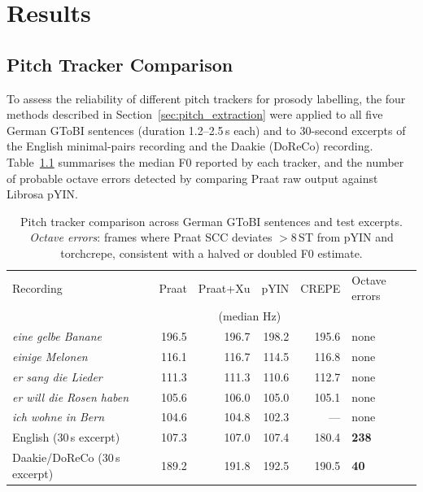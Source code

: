 
\chapter{Results}
\label{results}

\newpage

\section{Pitch Tracker Comparison}
\label{sec:tracker_results}

To assess the reliability of different pitch trackers for prosody labelling, the
four methods described in Section~\ref{sec:pitch_extraction} were applied to all
five German GToBI sentences (duration 1.2--2.5\,s each) and to 30-second excerpts
of the English minimal-pairs recording and the Daakie (DoReCo) recording.
Table~\ref{tab:pitch_comparison} summarises the median F0 reported by each
tracker, and the number of probable octave errors detected by comparing Praat raw
output against Librosa pYIN.

\begin{table}[h]
\centering
\caption{Pitch tracker comparison across German GToBI sentences and test excerpts.
         \emph{Octave errors}: frames where Praat SCC deviates $>$8\,ST from
         pYIN and torchcrepe, consistent with a halved or doubled F0 estimate.}
\label{tab:pitch_comparison}
\small
\begin{tabular}{lrrrrl}
\hline
Recording & \multicolumn{1}{c}{Praat} & \multicolumn{1}{c}{Praat+Xu} &
            \multicolumn{1}{c}{pYIN} & \multicolumn{1}{c}{CREPE} &
            Octave errors \\
          & \multicolumn{4}{c}{(median Hz)} & \\
\hline
\textit{eine gelbe Banane}      & 196.5 & 196.7 & 198.2 & 195.6 & none \\
\textit{einige Melonen}         & 116.1 & 116.7 & 114.5 & 116.8 & none \\
\textit{er sang die Lieder}     & 111.3 & 111.3 & 110.6 & 112.7 & none \\
\textit{er will die Rosen haben}& 105.6 & 106.0 & 105.0 & 105.1 & none \\
\textit{ich wohne in Bern}      & 104.6 & 104.8 & 102.3 & ---   & none \\
English (30\,s excerpt)         & 107.3 & 107.0 & 107.4 & 180.4 & \textbf{238} \\
Daakie/DoReCo (30\,s excerpt)   & 189.2 & 191.8 & 192.5 & 190.5 & \textbf{40} \\
\hline
\end{tabular}
\end{table}

